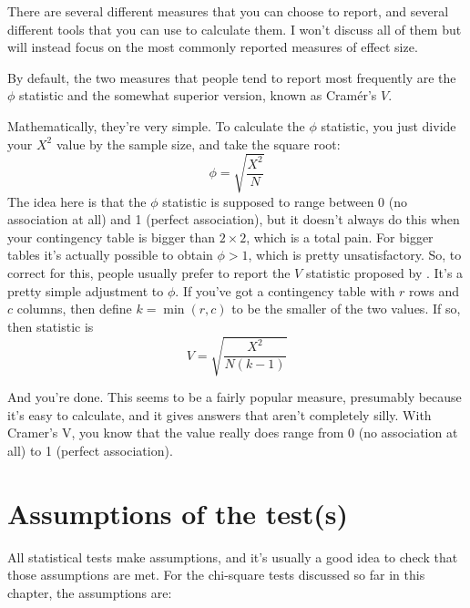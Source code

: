 There are several different measures that you can choose to report, and several different tools that you can use to calculate them. I won't discuss all of them but will instead focus on the most commonly reported measures of effect size. 

By default, the two measures that people tend to report most frequently are the $\phi$ statistic and the somewhat superior version, known as  Cram\'er's $V$. 

\vspace{0.5cm}
\begin{mdframed}[style=MyFrame,nobreak=true]
Mathematically, they're very simple. To calculate the $\phi$ statistic, you just divide your $X^2$ value by the sample size, and take the square root:
$$
\phi = \sqrt{\frac{X^2}{N}}
$$
The idea here is that the $\phi$ statistic is supposed to range between 0 (no association at all) and 1 (perfect association), but it doesn't always do this when your contingency table is bigger than $2 \times 2$, which is a total pain. For bigger tables it's actually possible to obtain $\phi>1$, which is pretty unsatisfactory. So, to correct for this, people usually prefer to report the $V$ statistic proposed by \textcite{Cramer1946}. It's a pretty simple adjustment to $\phi$. If you've got a contingency table with $r$ rows and $c$ columns, then define $k = \min(r,c)$ to be the smaller of the two values. If so, then  statistic is
$$
V = \sqrt{\frac{X^2}{N(k-1)}}
$$
\end{mdframed}

And you're done. This seems to be a fairly popular measure, presumably because it's easy to calculate, and it gives answers that aren't completely silly. With Cramer’s V, you know that the value really does range from 0 (no association at all) to 1 (perfect association). 


\section{Assumptions of the test(s)~\label{sec:chisqassumptions}}

All statistical tests make assumptions, and it's usually a good idea to check that those assumptions are met. For the chi-square tests discussed so far in this chapter, the assumptions are:

